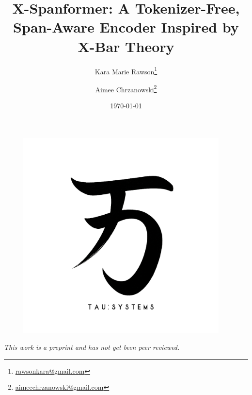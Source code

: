\documentclass[11pt]{article}
\title{\textbf{X-Spanformer: A Tokenizer-Free, Span-Aware Encoder Inspired by X-Bar Theory}}
\author{
	Kara Marie Rawson\thanks{\href{mailto:rawsonkara@gmail.com}{rawsonkara@gmail.com}} \and
	Aimee Chrzanowski\thanks{\href{mailto:aimeechrzanowski@gmail.com}{aimeechrzanowski@gmail.com}}
}
\date{\today}
\begin{document}
	
	\begin{figure}[H]
		\centering
		\includegraphics[width=0.95\textwidth]{figures/figure_00.png}
	\end{figure}
	\vspace{2em}
	
	\maketitle
	
	\begin{center}
		\textit{This work is a preprint and has not yet been peer reviewed.}
	\end{center}
	
	
	
	
	
	
	
	
	
	
	
	
	\printbibliography
	
\end{document}
